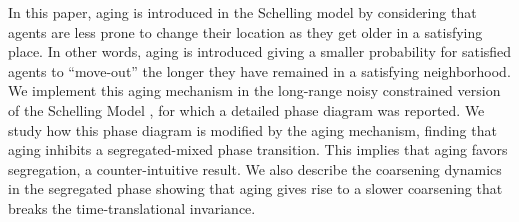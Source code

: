 
In this paper, aging is introduced in the Schelling model by considering that agents are less prone to change their location as they get older in a satisfying place. In other words, aging is introduced giving a smaller probability for  satisfied agents to ``move-out'' the longer they have remained in a satisfying neighborhood. We implement this aging mechanism in the long-range noisy constrained version of the Schelling Model \cite{Gauvin_2009}, for which a detailed phase diagram was reported. We study how this phase diagram is modified by the aging mechanism, finding that aging inhibits a segregated-mixed phase transition. This implies that aging favors segregation, a counter-intuitive result. We also describe the coarsening dynamics in the segregated phase showing that aging gives rise to a slower coarsening that breaks the time-translational invariance.



